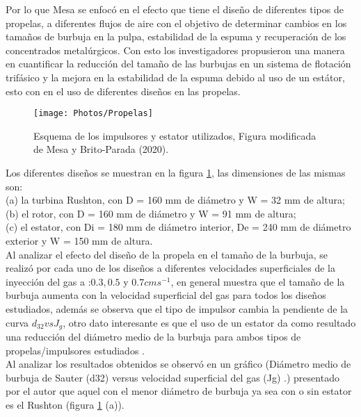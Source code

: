 \documentclass[11pt,letter
								]
								{article}
\begin{document}
Por lo que Mesa \cite{Art2} se enfocó en el efecto que tiene el diseño de diferentes tipos de propelas, a diferentes flujos de aire con el objetivo de determinar cambios en los tamaños de burbuja en la pulpa, estabilidad de la espuma y recuperación de los concentrados metalúrgicos.  Con esto los investigadores propusieron   una manera en cuantificar la reducción del tamaño de las burbujas en un sistema de flotación trifásico y la mejora en la estabilidad de la espuma debido al uso de un estátor, esto con en el uso de diferentes diseños en las propelas.


\begin{figure}[H]
\centering
\texttt{[image: Photos/Propelas]}
\caption{Esquema de los impulsores y estator utilizados, Figura modificada de Mesa y Brito-Parada (2020).\cite{Art2}} 
\label{Propelas}
\end{figure}



Los diferentes diseños se muestran en la figura \ref{Propelas}, las dimensiones de las mismas son:\\
(a) la turbina Rushton, con D = 160 mm de diámetro y W = 32 mm de altura;\\
(b) el rotor, con D = 160 mm de diámetro y W = 91 mm de altura; \\
(c) el estator, con Di = 180 mm de diámetro interior, De = 240 mm de diámetro exterior y W = 150 mm de altura. \\

Al analizar el efecto del diseño de la propela en el tamaño de la burbuja, se realizó por cada uno de los diseños a diferentes velocidades  superficiales de la inyección del gas a :$ 0.3, 0.5 $ y $ 0.7 cm s^{-1}$, en general muestra que  el tamaño de la burbuja aumenta con la velocidad superficial del gas para todos los diseños estudiados, además se observa que el tipo de impulsor cambia la pendiente de la curva $d_{32} vs J_{g}$, otro dato interesante es que el uso de un estator da como resultado una reducción del diámetro medio de la burbuja para ambos tipos  de propelas/impulsores estudiados .\\

Al analizar los resultados obtenidos se observó  en un gráfico (Diámetro medio de burbuja de Sauter (d32) versus velocidad superficial del gas (Jg) .\cite{Art2}) presentado por el autor que aquel con el menor diámetro de burbuja  ya sea con o sin estator es el Rushton (figura \ref{Propelas} (a)).
\end{document}
